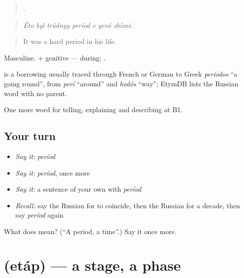 \begin{quote}
      .
\end{quote}

\begin{quote}
\emph{Éto byl trúdnyy períod v yevó zhízni.}
\end{quote}

\begin{quote}
It was a hard period in his life.
\end{quote}

Masculine. \emph{ } + genitive — during: \emph{  }.

\begin{cousinweb}
\emph{} is a borrowing usually traced through French or German to Greek \emph{períodos} \textquotedblleft{}a going round\textquotedblright{}, from \emph{perí} \textquotedblleft{}around\textquotedblright{} and \emph{hodós} \textquotedblleft{}way\textquotedblright{}; EtymDB lists the Russian word with no parent.
\end{cousinweb}

\begin{grammarlens}[title={What you've built}]
One more word for telling, explaining and describing at B1.
\end{grammarlens}

\subsection*{Your turn}
\begin{itemize}
\raggedright
  \item \emph{Say it:} \emph{períod}
  \item \emph{Say it:} \emph{períod}, once more
  \item \emph{Say it:} a sentence of your own with \emph{períod}
  \item \emph{Recall:} say the Russian for to coincide, then the Russian for a decade, then say \emph{períod} again
\end{itemize}

\begin{tcolorbox}[breakable,colback=teal!4,colframe=teal!35!black,title={Before you move on}]
What does  mean? (\textquotedblleft{}A period, a time\textquotedblright{}.) Say it once more.
\end{tcolorbox}
\section[\texorpdfstring{\ru{этап} (etáp)}{этап (etáp)}]{ (etáp) — a stage, a phase}


